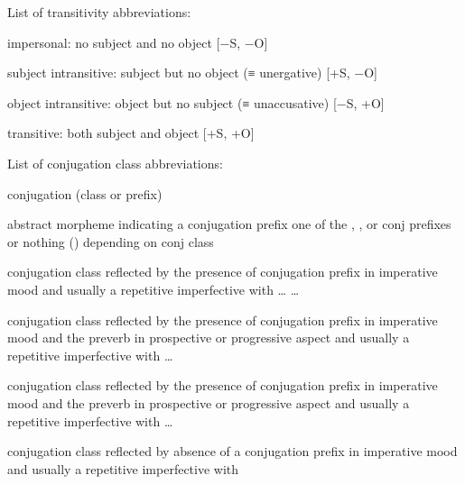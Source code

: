 \vspace{\baselineskip}
\noindent
List of transitivity abbreviations:
\begin{description}[font={\normalfont}, style=sameline, labelindent=\parindent, labelwidth=4em, leftmargin=!]
\item[impers]		impersonal: no subject and no object
			\hfill{}[−S, −O]
\item[subj intr]	subject intransitive: subject but no object (≡ unergative)
			\hfill{}[+S, −O]
\item[obj intr]		object intransitive: object but no subject (≡ unaccusative)
			\hfill{}[−S, +O]
\item[tr]		transitive: both subject and object
			\hfill{}[+S, +O]
\end{description}

\vspace{\baselineskip}
\noindent
List of conjugation class abbreviations:
\begin{description}[font={\normalfont}, style=sameline, labelindent=\parindent, labelwidth=3em, leftmargin=!]
\item[conj]	conjugation (class or prefix)
\item[\fm{\xx{cnj}-}]
		abstract morpheme indicating a conjugation prefix\newline
		one of the , , or  conj prefixes or nothing ()
			depending on conj class
\item[\fm{n}]	 conjugation class\newline
		reflected by the presence of  conjugation prefix in imperative mood\newline
		and usually a repetitive imperfective with  …  … 
\item[\fm{g̱}]	 conjugation class\newline
		reflected by the presence of  conjugation prefix in imperative mood\newline
		and the  preverb in prospective or progressive aspect\newline
		and usually a repetitive imperfective with  … 
\item[\fm{g}]	 conjugation class\newline
		reflected by the presence of  conjugation prefix in imperative mood\newline
		and the  preverb in prospective or progressive aspect
		and usually a repetitive imperfective with  … 
\item[\fm{∅}]	 conjugation class\newline
		reflected by absence of a conjugation prefix in imperative mood\newline
		and usually a repetitive imperfective with 
\end{description}

